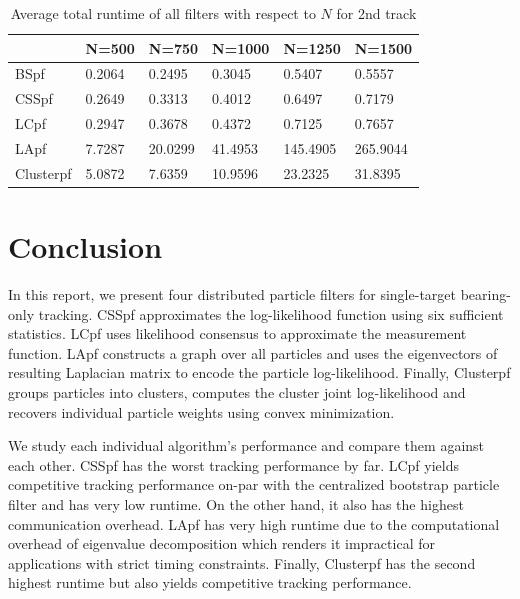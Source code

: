 \documentclass[10pt,letterpaper,final]{article}
\begin{document}
\begin{table}[]
\centering
\begin{tabular}{|l|l|l|l|l|l|}
\hline
          & N=500  & N=750   & N=1000  & N=1250   & N=1500   \\ \hline
BSpf      & 0.2064 & 0.2495  & 0.3045  & 0.5407   & 0.5557   \\ \hline
CSSpf     & 0.2649 & 0.3313  & 0.4012  & 0.6497   & 0.7179   \\ \hline
LCpf      & 0.2947 & 0.3678  & 0.4372  & 0.7125   & 0.7657   \\ \hline
LApf      & 7.7287 & 20.0299 & 41.4953 & 145.4905 & 265.9044 \\ \hline
Clusterpf & 5.0872 & 7.6359  & 10.9596 & 23.2325  & 31.8395  \\ \hline
\end{tabular}
\caption{Average total runtime of all filters with respect to $N$ for 2nd track}
\label{tab:runtime_track2_N}
\end{table}

\section{Conclusion}
\label{sec:conclusion}
In this report, we present four distributed particle filters for single-target bearing-only tracking. CSSpf approximates the log-likelihood function using six sufficient statistics. LCpf uses likelihood consensus to approximate the measurement function. LApf constructs a graph over all particles and uses the eigenvectors of resulting Laplacian matrix to encode the particle log-likelihood. Finally, Clusterpf groups particles into clusters, computes the cluster joint log-likelihood and recovers individual particle weights using convex minimization. 

We study each individual algorithm's performance and compare them against each other. CSSpf has the worst tracking performance by far. LCpf yields competitive tracking performance on-par with the centralized bootstrap particle filter and has very low runtime. On the other hand, it also has the highest communication overhead. LApf has very high runtime due to the computational overhead of eigenvalue decomposition which renders it impractical for applications with strict timing constraints. Finally, Clusterpf has the second highest runtime but also yields competitive tracking performance. 



\end{document}

